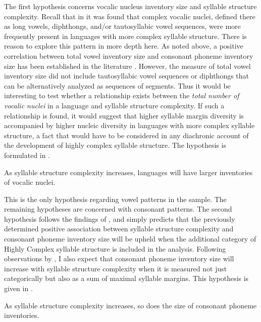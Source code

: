   The first hypothesis concerns vocalic nucleus inventory size and syllable structure complexity. Recall that in  it was found that complex vocalic nuclei, defined there as long vowels, diphthongs, and/or tautosyllabic vowel sequences, were more frequently present in languages with more complex syllable structure. There is reason to explore this pattern in more depth here. As noted above, a positive correlation between total vowel inventory size and consonant phoneme inventory size has been established in the literature \citep{Maddieson2011}. However, the measure of total vowel inventory size did not include tautosyllabic vowel sequences or diphthongs that can be alternatively analyzed as sequences of segments. Thus it would be interesting to test whether a relationship exists between the \textit{total number of vocalic nuclei} in a language and syllable structure complexity. If such a relationship is found, it would suggest that higher syllable margin diversity is accompanied by higher nucleic diversity in languages with more complex syllable structure, a fact that would have to be considered in any diachronic account of the development of highly complex syllable structure. The hypothesis is formulated in .

\ea\label{ex:4.2}
  As syllable structure complexity increases, languages will have larger inventories of vocalic nuclei.
\z

  This is the only hypothesis regarding vowel patterns in the sample. The remaining hypotheses are concerned with consonant patterns. The second hypothesis follows the findings of \citet{Maddieson2006}, and simply predicts that the previously determined positive association between syllable structure complexity and consonant phoneme inventory size will be upheld when the additional category of Highly Complex syllable structure is included in the analysis. Following observations by \citet{Gordon2016}, I also expect that consonant phoneme inventory size will increase with syllable structure complexity when it is measured not just categorically but also as a sum of maximal syllable margins. This hypothesis is given in .

\ea\label{ex:4.3}
  As syllable structure complexity increases, so does the size of consonant phoneme inventories.
\z

